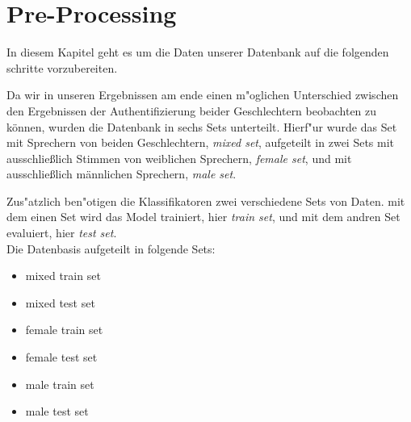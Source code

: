 \section{Pre-Processing}
\label{pre}

In diesem Kapitel geht es um die Daten unserer Datenbank auf die folgenden schritte vorzubereiten.

Da wir in unseren Ergebnissen am ende einen m"oglichen Unterschied zwischen den Ergebnissen der Authentifizierung beider Geschlechtern beobachten zu können, wurden die Datenbank in sechs Sets unterteilt.
Hierf"ur wurde das Set mit Sprechern von beiden Geschlechtern, \textit{mixed set}, aufgeteilt in zwei Sets mit ausschließlich Stimmen von weiblichen Sprechern, \textit{female set}, und mit ausschließlich männlichen Sprechern, \textit{male set}. 


Zus"atzlich ben"otigen die Klassifikatoren zwei verschiedene Sets von Daten.
mit dem einen Set wird das Model trainiert, hier \textit{train set}, und mit dem andren Set evaluiert, hier \textit{test set}. \\



Die Datenbasis aufgeteilt in folgende Sets:
\begin{itemize}
    \item[\textbullet] mixed train set
    \item[\textbullet] mixed test set
    \item[\textbullet] female train set
    \item[\textbullet] female test set
    \item[\textbullet] male train set
    \item[\textbullet] male test set
\end{itemize}

